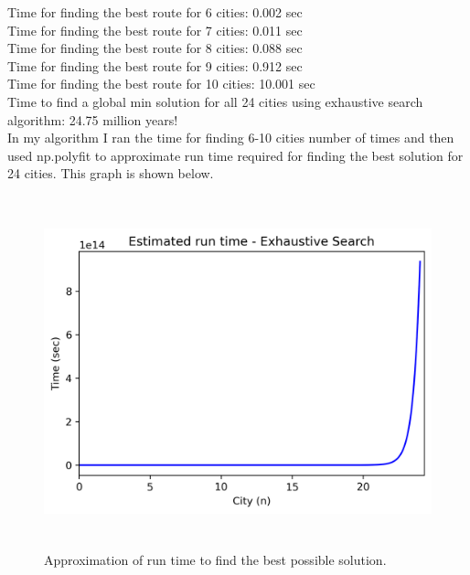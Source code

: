 \documentclass[a4paper,12pt]{article}
\begin{document}
Time for finding the best route for 6 cities:  0.002  sec\\
Time for finding the best route for 7 cities:  0.011  sec\\
Time for finding the best route for 8 cities:  0.088  sec\\
Time for finding the best route for 9 cities:  0.912  sec\\
Time for finding the best route for 10 cities:  10.001  sec\\
Time to find a global min solution for all 24 cities using exhaustive search algorithm:  24.75  million years!\\

In my algorithm I ran the time for finding 6-10 cities number of times and then used np.polyfit to approximate run time required for finding the best solution for 24 cities. This graph is shown below.

\begin{figure}[H]
\centerline{\includegraphics[width=6in, height=4in]{ExhaustiveSearch.png}}
\caption{Approximation of run time to find the best possible solution.}
\label{fig}
\end{figure}
\end{document}
